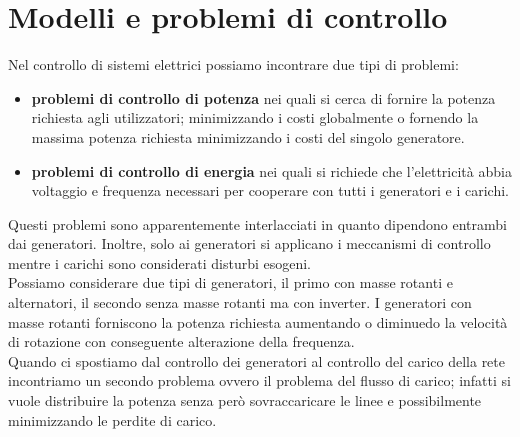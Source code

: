 ﻿\label{capitolo4}
\section{Modelli e problemi di controllo}
Nel controllo di sistemi elettrici possiamo incontrare due tipi di problemi:
\begin{itemize}
\item \textbf{problemi di controllo di potenza} nei quali si cerca di fornire la potenza richiesta agli utilizzatori; minimizzando i costi globalmente o fornendo la massima potenza richiesta minimizzando i costi del singolo generatore.
\item \textbf{problemi di controllo di energia} nei quali si richiede che l'elettricità abbia voltaggio e frequenza necessari per cooperare con tutti i generatori e i carichi. 
\end{itemize}
Questi problemi sono apparentemente interlacciati in quanto dipendono entrambi dai generatori. Inoltre, solo ai generatori si applicano i meccanismi di controllo mentre i carichi sono considerati disturbi esogeni.\\
Possiamo considerare due tipi di generatori, il primo con masse rotanti e alternatori, il secondo senza masse rotanti ma con inverter.
I generatori con masse rotanti forniscono la potenza richiesta aumentando o diminuedo la velocità di rotazione con conseguente alterazione della frequenza.\\
Quando ci spostiamo dal controllo dei generatori al controllo del carico della rete incontriamo un secondo problema ovvero il problema del flusso di carico; infatti si vuole distribuire la potenza senza però sovraccaricare le linee e possibilmente minimizzando le perdite di carico.\\

